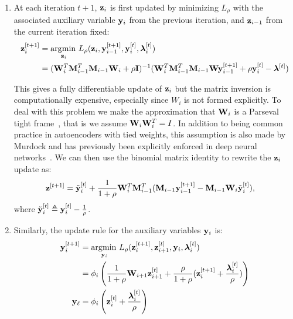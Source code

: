 \begin{enumerate}
\item
 At each iteration $t+1$, $\mathbf{z}_i$ is first updated by minimizing $L_\rho$ with the associated auxiliary variable $\mathbf{y}_i$ from the previous iteration, and $\mathbf{z}_{i-1}$ from the current iteration fixed:
  \begin{equation}
    \begin{aligned}
      \mathbf{z}^{[t+1]}_i & = \operatorname*{\arg\!\min\,}_{\mathbf{z}_i} L_\rho(\mathbf{z}_i, \mathbf{y}^{[t+1]}_{i-1}, \mathbf{y}^{[t]}_i, \bm{\lambda}_i^{[t]})\\
      &= (\mathbf{W}_i^T\mathbf{M}_{i-1}^T\mathbf{M}_{i-1}\mathbf{W}_i + \rho \mathbf{I})^{-1}(\mathbf{W}_{i}^T\mathbf{M}_{i-1}^T\mathbf{M}_{i-1}\mathbf{W}\mathbf{y}^{[t+1]}_{i-1} + \rho \mathbf{y}^{[t]}_{i} - \bm{\lambda}^{[t]})
    \end{aligned}
    \label{eq:wupdate1}  
  \end{equation}

  This gives a fully differentiable update of $\mathbf{z}_i$ but the matrix inversion is computationally expensive, especially since $W_i$ is not formed explicitly. To deal with this problem we make the approximation that $\mathbf{W}_i$ is a Parseval tight frame~\cite{murdock}, that is we assume $\mathbf{W}_i\mathbf{W}_i^T = I$. In addition to being common practice in autoencoders with tied weights, this assumption is also made by Murdock \etal and has previously been explicitly enforced in deep neural networks~\cite{moustapha}. We can then use the binomial matrix identity to rewrite the $\mathbf{z}_i$ update as:
  \begin{equation}
    \begin{aligned}
      \mathbf{z}^{[t+1]} &= \tilde{\mathbf{y}}_i^{[t]} + \frac{1}{1 + \rho}\mathbf{W}^T_i\mathbf{M}_{i-1}^T(\mathbf{M}_{i-1}\mathbf{y}^{[t+1]}_{i-1} - \mathbf{M}_{i-1}\mathbf{W}_i\tilde{\mathbf{y}}^{[t]}_i),
    \end{aligned}\label{eq:zupdate}
  \end{equation}
  where $\tilde{\mathbf{y}}_i^{[t]} \triangleq \mathbf{y}_i^{[t]} - \frac{1}{\rho}$.
\item
 Similarly, the update rule for the auxiliary variables $\mathbf{y}_i$ is:
  \begin{equation}
    \begin{aligned}
      \mathbf{y}_i^{[t+1]} & = \operatorname*{\arg\!\min\,}_{\mathbf{y}_i} L_\rho(\mathbf{z}^{[t+1]}_i, \mathbf{z}^{[t]}_{i+1}, \mathbf{y}_i, \bm{\lambda}_i^{[t]})\\
      &= \phi_i\left(\frac{1}{1+\rho}\mathbf{W}_{i+1}\mathbf{z}^{[t]}_{i+1} + \frac{\rho}{1+\rho}(\mathbf{z}^{[t+1]}_i + \frac{\bm{\lambda}_i^{[t]}}{\rho})\right)\\
      \mathbf{y}_{\ell} &= \phi_i\left(\mathbf{z}_i^{[t]} + \frac{\bm{\lambda}_i^{[t]}}{\rho}\right)
    \end{aligned}\label{eq:yupdate}
  \end{equation}


\end{enumerate}
